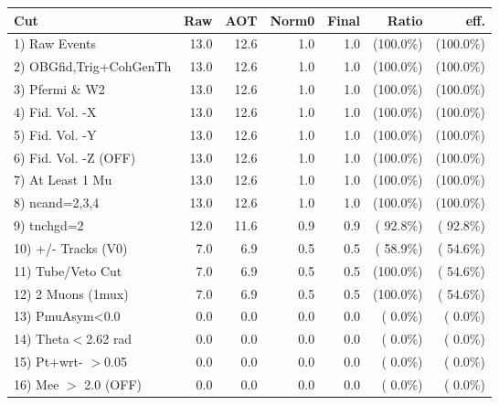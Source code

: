  \begin{table}[h!]\centering
 \begin{tabular}{||l||r|r|r|r|r|r||}
 \hline
 \hline
 Cut & Raw & AOT & Norm0 & Final & Ratio & eff.       \\
 \hline
  1) Raw Events           &         13.0 &         12.6 &          1.0 &          1.0 & (100.0\%) & (100.0\%) \\
  2) OBGfid,Trig+CohGenTh &         13.0 &         12.6 &          1.0 &          1.0 & (100.0\%) & (100.0\%) \\
  3) Pfermi \& W2         &         13.0 &         12.6 &          1.0 &          1.0 & (100.0\%) & (100.0\%) \\
  4) Fid. Vol. -X         &         13.0 &         12.6 &          1.0 &          1.0 & (100.0\%) & (100.0\%) \\
  5) Fid. Vol. -Y         &         13.0 &         12.6 &          1.0 &          1.0 & (100.0\%) & (100.0\%) \\
  6) Fid. Vol. -Z (OFF)   &         13.0 &         12.6 &          1.0 &          1.0 & (100.0\%) & (100.0\%) \\
  7) At Least 1 Mu        &         13.0 &         12.6 &          1.0 &          1.0 & (100.0\%) & (100.0\%) \\
  8) ncand=2,3,4          &         13.0 &         12.6 &          1.0 &          1.0 & (100.0\%) & (100.0\%) \\
  9) tnchgd=2             &         12.0 &         11.6 &          0.9 &          0.9 & ( 92.8\%) & ( 92.8\%) \\
 10) +/- Tracks (V0)      &          7.0 &          6.9 &          0.5 &          0.5 & ( 58.9\%) & ( 54.6\%) \\
 11) Tube/Veto Cut        &          7.0 &          6.9 &          0.5 &          0.5 & (100.0\%) & ( 54.6\%) \\
 12) 2 Muons (1mux)       &          7.0 &          6.9 &          0.5 &          0.5 & (100.0\%) & ( 54.6\%) \\
 13) PmuAsym<0.0          &          0.0 &          0.0 &          0.0 &          0.0 & (  0.0\%) & (  0.0\%) \\
 14) Theta$<$2.62 rad     &          0.0 &          0.0 &          0.0 &          0.0 & (  0.0\%) & (  0.0\%) \\
 15) Pt+wrt- $>$0.05      &          0.0 &          0.0 &          0.0 &          0.0 & (  0.0\%) & (  0.0\%) \\
 16) Mee $>$ 2.0  (OFF)   &          0.0 &          0.0 &          0.0 &          0.0 & (  0.0\%) & (  0.0\%) \\

\end{tabular}
\end{table}
